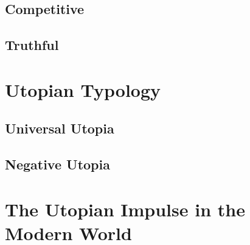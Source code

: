 \documentclass[12pt]{article}
\begin{document}
\subsection{Competitive}

\subsection{Truthful}

\section{Utopian Typology}
\subsection{Universal Utopia}
\subsection{Negative Utopia}

\section{The Utopian Impulse in the Modern World}
\end{document}
